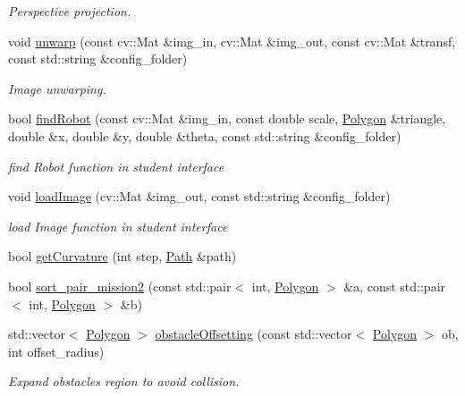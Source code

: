 \begin{DoxyCompactItemize}
\begin{DoxyCompactList}\small\item\em Perspective projection. \end{DoxyCompactList}\item 
void \hyperlink{namespacestudent_a6b8caf348979f55e58a75193233c219d}{unwarp} (const cv\+::\+Mat \&img\+\_\+in, cv\+::\+Mat \&img\+\_\+out, const cv\+::\+Mat \&transf, const std\+::string \&config\+\_\+folder)
\begin{DoxyCompactList}\small\item\em Image unwarping. \end{DoxyCompactList}\item 
bool \hyperlink{namespacestudent_afd56b779672a672e15ac45dc927b8a6b}{find\+Robot} (const cv\+::\+Mat \&img\+\_\+in, const double scale, \hyperlink{utils_8hpp_a18281038c49470960bd8f4d15b893441}{Polygon} \&triangle, double \&x, double \&y, double \&theta, const std\+::string \&config\+\_\+folder)
\begin{DoxyCompactList}\small\item\em find Robot function in student interface \end{DoxyCompactList}\item 
void \hyperlink{namespacestudent_a3117c968a47bf95f86bdb813a3b64e56}{load\+Image} (cv\+::\+Mat \&img\+\_\+out, const std\+::string \&config\+\_\+folder)
\begin{DoxyCompactList}\small\item\em load Image function in student interface \end{DoxyCompactList}\item 
bool \hyperlink{namespacestudent_a38f4da9abe090023fe1fbf23f75b5b42}{get\+Curvature} (int step, \hyperlink{structPath}{Path} \&path)
\item 
bool \hyperlink{namespacestudent_abf207b6433d914c39067b7d538c2956c}{sort\+\_\+pair\+\_\+mission2} (const std\+::pair$<$ int, \hyperlink{utils_8hpp_a18281038c49470960bd8f4d15b893441}{Polygon} $>$ \&a, const std\+::pair$<$ int, \hyperlink{utils_8hpp_a18281038c49470960bd8f4d15b893441}{Polygon} $>$ \&b)
\item 
std\+::vector$<$ \hyperlink{utils_8hpp_a18281038c49470960bd8f4d15b893441}{Polygon} $>$ \hyperlink{namespacestudent_a962ac10ed4e3bf5be63aad206b4fc624}{obstacle\+Offsetting} (const std\+::vector$<$ \hyperlink{utils_8hpp_a18281038c49470960bd8f4d15b893441}{Polygon} $>$ ob, int offset\+\_\+radius)
\begin{DoxyCompactList}\small\item\em Expand obstacles region to avoid collision. \end{DoxyCompactList}\item 

\end{DoxyCompactItemize}

